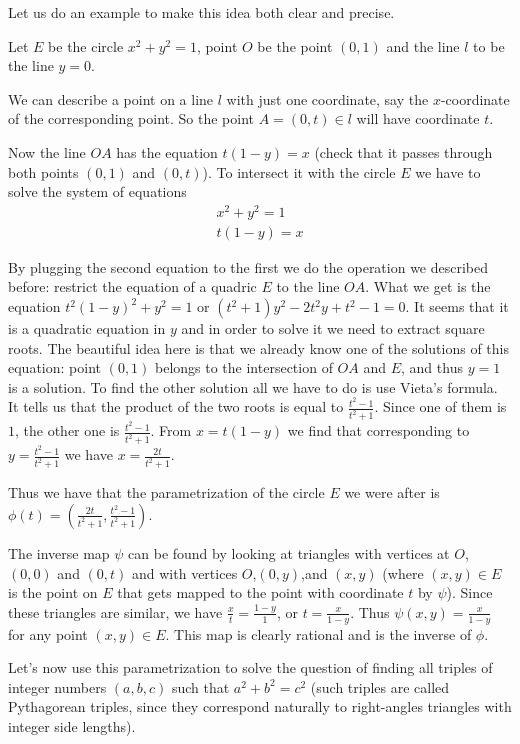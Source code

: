 {{Let us do an example to make this idea both clear and precise.

Let $E$ be the circle $x^2+y^2=1$, point $O$ be the point $(0,1)$ and the line $l$ to be the line $y=0$.

We can describe a point on a line $l$ with just one coordinate, say the $x$-coordinate of the corresponding point. So the point $A=(0,t)\in l$ will have coordinate $t$.

Now the line $OA$ has the equation $t(1-y)=x$ (check that it passes through both points $(0,1)$ and $(0,t)$). To intersect it with the circle $E$ we have to solve the system of equations
\begin{align*}
x^2+y^2=1\\
t(1-y)=x
\end{align*}

By plugging the second equation to the first we do the operation we described before: restrict the equation of a quadric $E$ to the line $OA$. What we get is the equation $t^2(1-y)^2+y^2=1$ or $(t^2+1)y^2-2t^2 y +t^2-1=0$. It seems that it is a quadratic equation in $y$ and in order to solve it we need to extract square roots. The beautiful idea here is that we already know one of the solutions of this equation: point $(0,1)$ belongs to the intersection of $OA$ and $E$, and thus $y=1$ is a solution. To find the other solution all we have to do is use Vieta's formula. It tells us that the product of the two roots is equal to $\frac{t^2-1}{t^2+1}$. Since one of them is $1$, the other one is $\frac{t^2-1}{t^2+1}$. From $x=t(1-y)$ we find that corresponding to $y=\frac{t^2-1}{t^2+1}$ we have $x=\frac{2t}{t^2+1}$.

Thus we have that the parametrization of the circle $E$ we were after is $\phi(t)=(\frac{2t}{t^2+1},\frac{t^2-1}{t^2+1})$.

The inverse map $\psi$ can be found by looking at triangles with vertices at $O$,$(0,0)$ and $(0,t)$ and with vertices $O$,$(0,y)$,and $(x,y)$ (where $(x,y)\in E$ is the point on $E$ that gets mapped to the point with coordinate $t$ by $\psi$). Since these triangles are similar, we have $\frac{x}{t}=\frac{1-y}{1}$, or $t=\frac{x}{1-y}$. Thus $\psi(x,y)=\frac{x}{1-y}$ for any point $(x,y)\in E$. This map is clearly rational and is the inverse of $\phi$.

Let's now use this parametrization to solve the question of finding all triples of integer numbers $(a,b,c)$ such that $a^2+b^2=c^2$ (such triples are called Pythagorean triples, since they correspond naturally to right-angles triangles with integer side lengths).

}}
